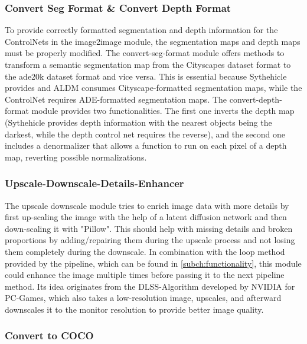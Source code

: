 \subsubsection{Convert Seg Format \& Convert Depth Format}
To provide correctly formatted segmentation and depth information for the ControlNets in the image2image module, the segmentation maps and depth maps must be properly modified.
The convert-seg-format module offers methods to transform a semantic segmentation map from the Cityscapes dataset \cite{cordts2016cityscapesdatasetsemanticurban} format to the ade20k dataset \cite{zhou2019semantic} format and vice versa. This is essential because Sythehicle \cite{Herzog_2023_WACV} provides and ALDM \cite{li2024aldm} consumes Cityscape-formatted segmentation maps, while the ControlNet requires ADE-formatted segmentation maps.
The convert-depth-format module provides two functionalities. The first one inverts the depth map (Sythehicle provides depth information with the nearest objects being the darkest, while the depth control net requires the reverse), and the second one includes a denormalizer that allows a function to run on each pixel of a depth map, reverting possible normalizations.

\subsubsection{Upscale-Downscale-Details-Enhancer}

The upscale downscale module tries to enrich image data with more details by first up-scaling the image with the help of a latent diffusion network \cite{rombach2022highresolution} and then down-scaling it with "Pillow". This should help with missing details and broken proportions by adding/repairing them during the upscale process and not losing them completely during the downscale. In combination with the loop method provided by the pipeline, which can be found in \autoref{subch:functionality}, this module could enhance the image multiple times before passing it to the next pipeline method. Its idea originates from the DLSS-Algorithm developed by NVIDIA \cite{watson2020deeplearningtechniquessuperresolution} for PC-Games, which also takes a low-resolution image, upscales, and afterward downscales it to the monitor resolution to provide better image quality.

\subsubsection{Convert to COCO}

